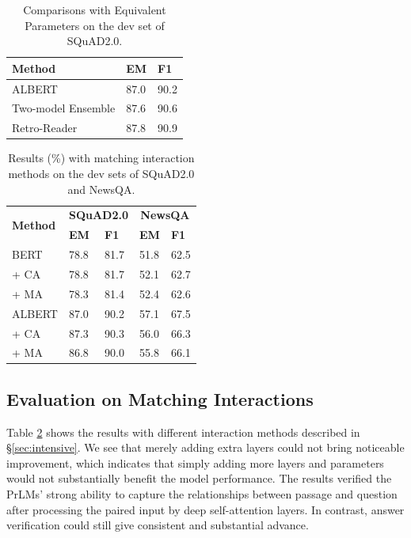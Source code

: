 \documentclass[letterpaper]{article} %
\begin{document}
\begin{table}
\begin{center}
\setlength{\tabcolsep}{13.5pt}
{
\begin{tabular}{lll}
\toprule
\textbf{Method}	& \textbf{EM} & \textbf{F1} \\
\midrule
ALBERT & 87.0 & 90.2  \\
Two-model Ensemble & 87.6  &  90.6    \\
Retro-Reader  &  87.8 & 90.9  \\
\bottomrule
\end{tabular}
}
\end{center}
\vspace{-2.14mm}
\caption{\label{tableequ} Comparisons with Equivalent Parameters on the dev set of SQuAD2.0.}
\end{table}

\begin{table}
\begin{center}
\setlength{\tabcolsep}{10pt}
{
\begin{tabular}{lllll}
\toprule
\multirow{2}{*}{\textbf{Method}} & \multicolumn{2}{c}{\textbf{SQuAD2.0}} & \multicolumn{2}{c}{\textbf{NewsQA}} \\
& \textbf{EM} & \textbf{F1} & \textbf{EM} & \textbf{F1} \\
\midrule
BERT &  78.8 & 81.7 & 51.8 & 62.5 \\
\quad     + CA &  78.8 & 81.7 & 52.1 & 62.7\\
\quad     + MA  &  78.3  & 81.4  & 52.4 & 62.6 \\
\midrule
ALBERT & 87.0 & 90.2 & 57.1 & 67.5\\
\quad     + CA & 87.3 & 90.3  & 56.0 & 66.3  \\
\quad     + MA  & 86.8 & 90.0  & 55.8 & 66.1  \\
\bottomrule
\end{tabular}
}
\end{center}
\caption{\label{tableatt} Results (\%) with matching interaction methods on the dev sets of SQuAD2.0 and NewsQA.}
\end{table}
\subsection{Evaluation on Matching Interactions}
Table \ref{tableatt} shows the results with different interaction methods described in \S\ref{sec:intensive}.
We see that merely adding extra layers could not bring noticeable improvement, which indicates that simply adding more layers and parameters would not substantially benefit the model performance. The results verified the PrLMs' strong ability to capture the relationships between passage and question after processing the paired input by deep self-attention layers. In contrast, answer verification could still give consistent and substantial advance.
\end{document}
